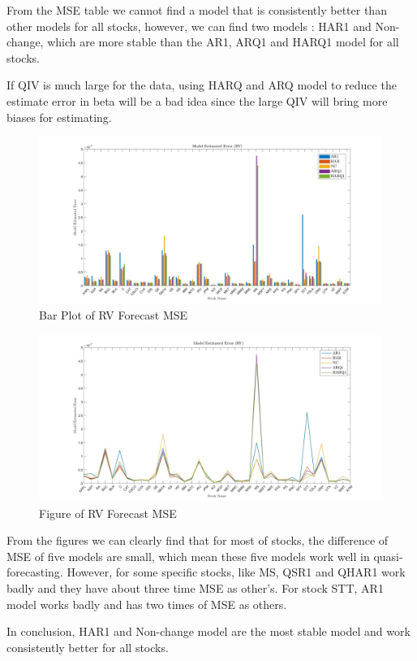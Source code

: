 \documentclass[12pt,letterpaper]{article}
\begin{document}
\begin{enumerate}[label=\textbf{(\Alph*)}]
From the MSE table we cannot find a model that is consistently better than other models for all stocks, however, we can find two models : HAR1 and Non-change, which are more stable than the AR1, ARQ1 and HARQ1 model for all stocks.

If QIV is much large for the data, using HARQ and ARQ model to reduce the estimate error in beta will be a bad idea since the large QIV will bring more biases for estimating. 

\begin{figure}[H]	
	\centering
	\includegraphics[width=12cm]{figures/3C11.jpg}
	\centering
	\caption{ Bar Plot of RV Forecast MSE}
\end{figure}
\newpage
\begin{figure}[H]	
	\centering
	\includegraphics[width=12cm]{figures/3C22.jpg}
	\centering
	\caption{ Figure of RV Forecast MSE}
\end{figure}
From the figures we can clearly find that for most of stocks, the difference of MSE of five models are small, which mean these five models work well in quasi-forecasting. However, for some specific stocks, like MS, QSR1 and QHAR1 work badly and they have about three time MSE as other's. For stock STT, AR1 model works badly and has two times of MSE as others. 

In conclusion, HAR1 and Non-change model are the most stable model and work consistently better for all stocks.



\end{enumerate}
\end{document}
